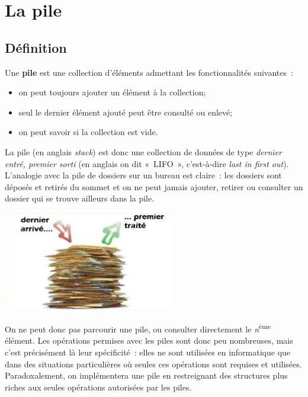 \chapter{La pile}


\section{Définition}
	
	Une \textbf{pile} est une collection d'éléments admettant 
	les fonctionnalités suivantes~:

	\begin{itemize}
		\item {
			on peut toujours ajouter un élément à la collection;}
		\item {
			seul le dernier élément ajouté peut être consulté ou enlevé;}
		\item {
			on peut savoir si la collection est vide.}
	\end{itemize}

	La pile (en anglais \textit{stack}) est donc une collection 
	de données de type \textit{dernier entré, premier sorti} (en
	anglais on dit «~LIFO~», c'est-à-dire \textit{last in first out}). 
	L'analogie avec la pile de dossiers sur un bureau
	est claire~: les dossiers sont déposés et retirés du sommet 
	et on ne peut jamais ajouter, retirer ou consulter un dossier 
	qui se trouve ailleurs dans la pile.
	
	\begin{center}
	\includegraphics[width=7.553cm,height=4.357cm]{image/a2012Logique2eme-img012.jpg}
	\end{center}
	
	On ne peut donc pas parcourir une pile, ou consulter directement 
	le \textit{n}\textsuperscript{ème} élément. Les opérations permises
	avec les piles sont donc peu nombreuses, mais c'est précisément 
	là leur spécificité~: elles ne sont utilisées en
	informatique que dans des situations particulières où seules 
	ces opérations sont requises et utilisées. Paradoxalement,
	on implémentera une pile en restreignant des structures plus 
	riches aux seules opérations autorisées par les piles.
	
